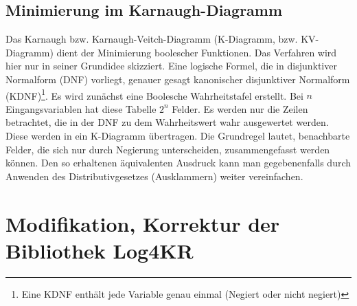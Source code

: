 \documentclass[a4paper, 11pt]{book}
\begin{document}
{	\section{Minimierung im Karnaugh-Diagramm}\label{Min_K_Dia} 
	Das Karnaugh bzw. Karnaugh-Veitch-Diagramm (K-Diagramm, bzw. KV-Diagramm) dient der Minimierung boolescher Funktionen. Das Verfahren wird hier nur in seiner Grundidee skizziert. Eine logische Formel, die in disjunktiver Normalform (DNF) vorliegt, genauer gesagt kanonischer disjunktiver Normalform (KDNF)\footnote{Eine KDNF enthält jede Variable genau einmal (Negiert oder nicht negiert)}. Es wird zunächst eine Boolesche Wahrheitstafel erstellt. Bei $ n $ Eingangsvariablen hat diese Tabelle $ 2^{n} $ Felder. Es werden nur die Zeilen betrachtet, die in der DNF zu dem Wahrheitswert wahr ausgewertet werden. Diese werden in ein K-Diagramm übertragen.  Die Grundregel lautet, benachbarte Felder, die sich nur durch Negierung unterscheiden, zusammengefasst werden können. Den so erhaltenen äquivalenten Ausdruck kann man gegebenenfalls durch Anwenden des Distributivgesetzes (Ausklammern) weiter vereinfachen.

\chapter{Modifikation, Korrektur der Bibliothek Log4KR} \label{Modifikaiton Log4KR}
}
\end{document}
